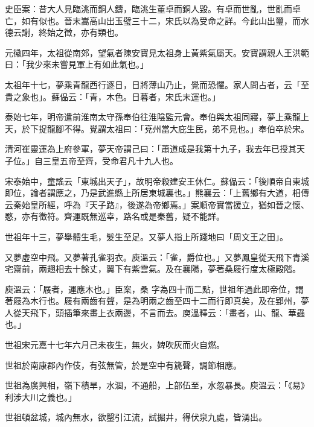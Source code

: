 \begin{pinyinscope}
 史臣案：昔大人見臨洮而銅人鑄，臨洮生董卓而銅人毀。有卓而世亂，世亂而卓亡，如有似也。晉末嵩高山出玉璧三十二，宋氏以為受命之詳。今此山出璽，而水德云謝，終始之徵，亦有類也。



 元徽四年，太祖從南郊，望氣者陳安寶見太祖身上黃紫氣屬天。安寶謂親人王洪範曰：「我少來未嘗見軍上有如此氣也。」



 太祖年十七，夢乘青龍西行逐日，日將薄山乃止，覺而恐懼。家人問占者，云「至貴之象也」。蘇偘云：「青，木色。日暮者，宋氏末運也。」



 泰始七年，明帝遣前淮南太守孫奉伯往淮陰監元會。奉伯與太祖同寢，夢上乘龍上天，於下捉龍腳不得。覺謂太祖曰：「兗州當大庇生民，弟不見也。」奉伯卒於宋。



 清河崔靈運為上府參軍，夢天帝謂己曰：「蕭道成是我第十九子，我去年已授其天子位。」自三皇五帝至齊，受命君凡十九人也。



 宋泰始中，童謠云「東城出天子」，故明帝殺建安王休仁。蘇偘云：「後順帝自東城即位，論者謂應之，乃是武進縣上所居東城裏也。」熊襄云：「上舊鄉有大道，相傳云秦始皇所經，呼為『天子路』，後遂為帝鄉焉。」案順帝實當援立，猶如晉之懷、愍，亦有徵符。齊運既無巡幸，路名或是秦舊，疑不能詳。



 世祖年十三，夢舉體生毛，髮生至足。又夢人指上所踐地曰「周文王之田」。



 又夢虛空中飛。又夢著孔雀羽衣。庾溫云：「雀，爵位也。」又夢鳳皇從天飛下青溪宅齋前，兩翅相去十餘丈，翼下有紫雲氣。及在襄陽，夢著桑屐行度太極殿階。



 庾溫云：「屐者，運應木也。」臣案，桑
 字為四十而二點，世祖年過此即帝位，謂著屐為木行也。屐有兩齒有聲，是為明兩之齒至四十二而行即真矣，及在郢州，夢人從天飛下，頭插筆來畫上衣兩邊，不言而去。庾溫釋云：「畫者，山、龍、華蟲也。」



 世祖宋元嘉十七年六月己未夜生，無火，婢吹灰而火自燃。



 世祖於南康郡內作伎，有弦無管，於是空中有篪聲，調節相應。



 世祖為廣興相，嶺下積旱，水涸，不通船，上部伍至，水忽暴長。庾溫云：「《易》利涉大川之義也。」



 世祖頓盆城，城內無水，欲鑿引江流，試掘井，得伏泉九處，皆湧出。




\end{pinyinscope}
